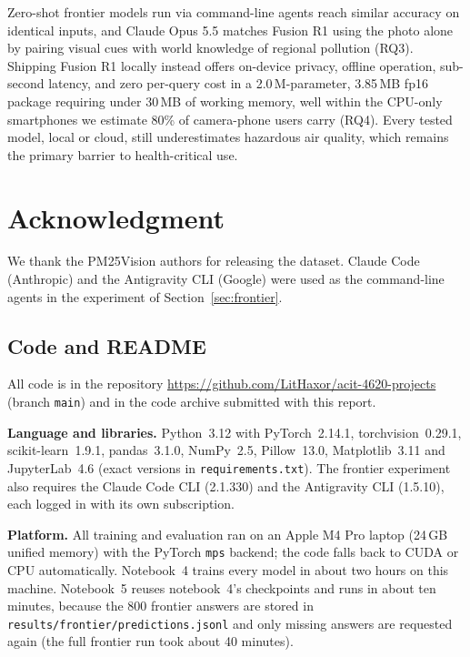 \documentclass[conference]{IEEEtran}
\begin{document}
Zero-shot frontier models run via command-line agents reach similar accuracy on
identical inputs, and Claude Opus 5.5 matches Fusion R1 using the photo alone by
pairing visual cues with world knowledge of regional pollution (RQ3). Shipping
Fusion R1 locally instead offers on-device privacy, offline operation,
sub-second latency, and zero per-query cost in a 2.0\,M-parameter, 3.85\,MB fp16
package requiring under 30\,MB of working memory, well within the CPU-only
smartphones we estimate 80\% of camera-phone users carry (RQ4). Every tested
model, local or cloud, still underestimates hazardous air quality, which remains
the primary barrier to health-critical use.

\section*{Acknowledgment}

We thank the PM25Vision authors for releasing the dataset. Claude Code
(Anthropic) and the Antigravity CLI (Google) were used as the command-line
agents in the experiment of Section~\ref{sec:frontier}.




\appendix

\subsection{Code and README}

All code is in the repository
\url{https://github.com/LitHaxor/acit-4620-projects} (branch \texttt{main}) and
in the code archive submitted with this report.

\textbf{Language and libraries.} Python~3.12 with PyTorch~2.14.1,
torchvision~0.29.1, scikit-learn~1.9.1, pandas~3.1.0, NumPy~2.5, Pillow~13.0,
Matplotlib~3.11 and JupyterLab~4.6 (exact versions in
\texttt{requirements.txt}). The frontier experiment also requires the Claude
Code CLI (2.1.330) and the Antigravity CLI (1.5.10), each logged in with its own
subscription.

\textbf{Platform.} All training and evaluation ran on an Apple M4 Pro laptop
(24\,GB unified memory) with the PyTorch \texttt{mps} backend; the code falls
back to CUDA or CPU automatically. Notebook~4 trains every model in about two
hours on this machine. Notebook~5 reuses notebook~4's checkpoints and runs in
about ten minutes, because the 800 frontier answers are stored in
\texttt{results/frontier/predictions.jsonl} and only missing answers are
requested again (the full frontier run took about 40 minutes).
\end{document}
